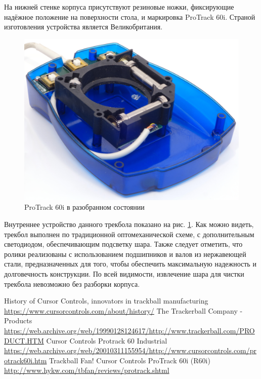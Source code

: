 \documentclass[11pt, a4paper]{article}
\begin{document}
На нижней стенке корпуса присутствуют резиновые ножки, фиксирующие надёжное положение на поверхности стола, и маркировка ProTrack 60i. Страной изготовления устройства является Великобритания.

\begin{figure}[h]
    \centering
    \includegraphics[scale=0.6]{1999_protrack_60i/razobr3_60.jpg}
    \caption{ProTrack 60i в разобранном состоянии}
    \label{fig:ProTrack60iInside}
\end{figure}

 Внутреннее устройство данного трекбола показано на рис. \ref{fig:ProTrack60iInside}. Как можно видеть,  трекбол выполнен по традиционной оптомеханической схеме, с дополнительным светодиодом, обеспечивающим подсветку шара. Также следует отметить, что ролики реализованы с использованием подшипников и валов из нержавеющей стали, предназначенных для того, чтобы обеспечить максимальную надежность и долговечность конструкции.
По всей видимости, извлечение шара для чистки трекбола невозможно без разборки корпуса.

\begin{thebibliography}{9}
 History of Cursor Controls, innovators in trackball manufacturing \url{https://www.cursorcontrols.com/about/history/}
 The Trackerball Company - Products \url{https://web.archive.org/web/19990128124617/http://www.trackerball.com/PRODUCT.HTM}
 Cursor Controls Protrack 60 Industrial \url{https://web.archive.org/web/20010311155954/http://www.cursorcontrols.com/protrack60i.htm}
 Trackball Fan! Cursor Controls ProTrack 60i (R60i) \url{http://www.hykw.com/tbfan/reviews/protrack.shtml}
\end{thebibliography}
\end{document}
